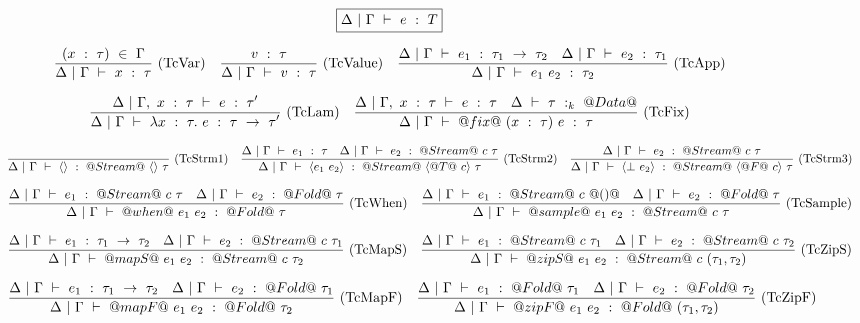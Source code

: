 \begin{figure*}

$$
\boxed{\Delta~|~\Gamma ~\vdash~ e~:~T}
$$


$$
\enskip \frac {\displaystyle 
    (x~:~\tau)~\in~\Gamma
} {\displaystyle  
    \Delta~|~\Gamma ~\vdash~ x~:~\tau
} \  \mbox{(TcVar)} \enskip
\enskip \frac {\displaystyle 
    v~:~\tau
} {\displaystyle  
    \Delta~|~\Gamma ~\vdash~ v~:~\tau
} \  \mbox{(TcValue)} \enskip
\enskip \frac {\displaystyle 
    \Delta~|~\Gamma ~\vdash~ e_1~:~\tau_1~\to~\tau_2
    \quad
    \Delta~|~\Gamma ~\vdash~ e_2~:~\tau_1
} {\displaystyle  
    \Delta~|~\Gamma ~\vdash~ e_1~e_2~:~\tau_2
} \  \mbox{(TcApp)} \enskip
$$

$$
\enskip \frac {\displaystyle 
    \Delta~|~\Gamma,~x~:~\tau ~\vdash~ e~:~\tau'
} {\displaystyle 
    \Delta~|~\Gamma ~\vdash~ \lambda{}x~:~\tau.~e~:~\tau~\to~\tau'
} \  \mbox{(TcLam)} \enskip
\enskip \frac {\displaystyle 
    \Delta~|~\Gamma,~x~:~\tau ~\vdash~ e~:~\tau
    \quad
    \Delta~\vdash~\tau~:_k~@Data@
} {\displaystyle 
    \Delta~|~\Gamma ~\vdash~ @fix@~(x~:~\tau)~e~:~\tau
} \  \mbox{(TcFix)} \enskip
$$

$$
\enskip \frac {\displaystyle } {\displaystyle 
    \Delta~|~\Gamma ~\vdash~ \langle \rangle~:~@Stream@~\langle\rangle~\tau
} \  \mbox{(TcStrm1)} \enskip
\enskip \frac {\displaystyle 
    \Delta~|~\Gamma ~\vdash~ e_1~:~\tau
    \quad
    \Delta~|~\Gamma ~\vdash~ e_2~:~@Stream@~c~\tau
} {\displaystyle 
    \Delta~|~\Gamma ~\vdash~ \langle e_1~e_2 \rangle~:~@Stream@~\langle @T@~c \rangle~\tau
} \  \mbox{(TcStrm2)} \enskip
\enskip \frac {\displaystyle 
    \Delta~|~\Gamma ~\vdash~ e_2~:~@Stream@~c~\tau
} {\displaystyle 
    \Delta~|~\Gamma ~\vdash~ \langle \bot~e_2 \rangle~:~@Stream@~\langle @F@~c \rangle~\tau
} \  \mbox{(TcStrm3)} \enskip
$$

$$
\enskip \frac {\displaystyle 
    \Delta~|~\Gamma ~\vdash~ e_1~:~@Stream@~c~\tau
    \quad
    \Delta~|~\Gamma ~\vdash~ e_2~:~@Fold@~\tau
} {\displaystyle 
    \Delta~|~\Gamma ~\vdash~ @when@~e_1~e_2~:~@Fold@~\tau
} \  \mbox{(TcWhen)} \enskip
\enskip \frac {\displaystyle 
    \Delta~|~\Gamma ~\vdash~ e_1~:~@Stream@~c~@()@
    \quad
    \Delta~|~\Gamma ~\vdash~ e_2~:~@Fold@~\tau
} {\displaystyle 
    \Delta~|~\Gamma ~\vdash~ @sample@~e_1~e_2~:~@Stream@~c~\tau
} \  \mbox{(TcSample)} \enskip
$$

$$
\enskip \frac {\displaystyle 
    \Delta~|~\Gamma ~\vdash~ e_1~:~\tau_1~\to~\tau_2
    \quad
    \Delta~|~\Gamma ~\vdash~ e_2~:~@Stream@~c~\tau_1
} {\displaystyle 
    \Delta~|~\Gamma ~\vdash~ @mapS@~e_1~e_2~:~@Stream@~c~\tau_2
} \  \mbox{(TcMapS)} \enskip
\enskip \frac {\displaystyle 
    \Delta~|~\Gamma ~\vdash~ e_1~:~@Stream@~c~\tau_1
    \quad
    \Delta~|~\Gamma ~\vdash~ e_2~:~@Stream@~c~\tau_2
} {\displaystyle 
    \Delta~|~\Gamma ~\vdash~ @zipS@~e_1~e_2~:~@Stream@~c~(\tau_1,\tau_2)
} \  \mbox{(TcZipS)} \enskip
$$

$$
\enskip \frac {\displaystyle 
    \Delta~|~\Gamma ~\vdash~ e_1~:~\tau_1~\to~\tau_2
    \quad
    \Delta~|~\Gamma ~\vdash~ e_2~:~@Fold@~\tau_1
} {\displaystyle 
    \Delta~|~\Gamma ~\vdash~ @mapF@~e_1~e_2~:~@Fold@~\tau_2
} \  \mbox{(TcMapF)} \enskip
\enskip \frac {\displaystyle 
    \Delta~|~\Gamma ~\vdash~ e_1~:~@Fold@~\tau_1
    \quad
    \Delta~|~\Gamma ~\vdash~ e_2~:~@Fold@~\tau_2
} {\displaystyle 
    \Delta~|~\Gamma ~\vdash~ @zipF@~e_1~e_2~:~@Fold@~(\tau_1,\tau_2)
} \  \mbox{(TcZipF)} \enskip
$$


\end{figure*}
